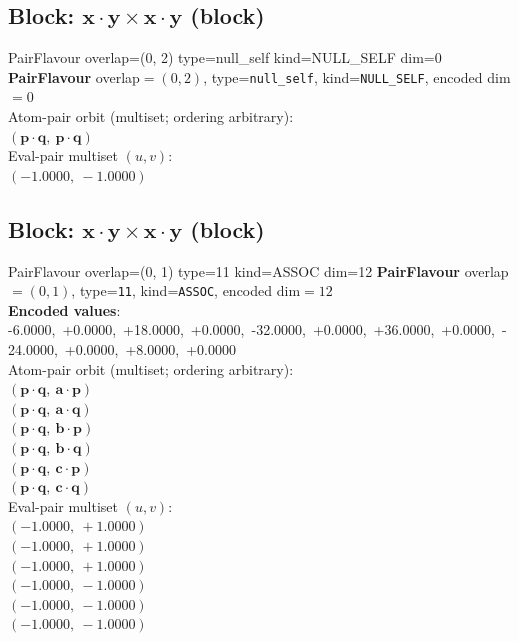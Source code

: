 \documentclass[a4paper,11pt]{article}
\newcommand{\pdcegfomjfhook}[2]{\mathbf{#1} \cdot \mathbf{#2}}
\begin{document}
\subsection{Block: $\pdcegfomjfhook{x}{y} \times \pdcegfomjfhook{x}{y}$  (block)}
    PairFlavour  overlap=(0, 2)  type=null\_self  kind=NULL\_SELF  dim=0
\textbf{PairFlavour} overlap$=(0, 2)$, type=\texttt{null\_self}, kind=\texttt{NULL\_SELF}, encoded dim$=0$\\
\quad Atom-pair orbit (multiset; ordering arbitrary):\\
$(\pdcegfomjfhook{p}{q},\ \pdcegfomjfhook{p}{q})$\\
\quad Eval-pair multiset $(u, v)$:\\
$(-1.0000,\ -1.0000)$\\

\subsection{Block: $\pdcegfomjfhook{x}{y} \times \pdcegfomjfhook{x}{y}$  (block)}
    PairFlavour  overlap=(0, 1)  type=11  kind=ASSOC  dim=12
\textbf{PairFlavour} overlap$=(0, 1)$, type=\texttt{11}, kind=\texttt{ASSOC}, encoded dim$=12$\\
\textbf{      Encoded values}: -6.0000,\ +0.0000,\ +18.0000,\ +0.0000,\ -32.0000,\ +0.0000,\ +36.0000,\ +0.0000,\ -24.0000,\ +0.0000,\ +8.0000,\ +0.0000\\
\quad Atom-pair orbit (multiset; ordering arbitrary):\\
$(\pdcegfomjfhook{p}{q},\ \pdcegfomjfhook{a}{p})$\\
$(\pdcegfomjfhook{p}{q},\ \pdcegfomjfhook{a}{q})$\\
$(\pdcegfomjfhook{p}{q},\ \pdcegfomjfhook{b}{p})$\\
$(\pdcegfomjfhook{p}{q},\ \pdcegfomjfhook{b}{q})$\\
$(\pdcegfomjfhook{p}{q},\ \pdcegfomjfhook{c}{p})$\\
$(\pdcegfomjfhook{p}{q},\ \pdcegfomjfhook{c}{q})$\\
\quad Eval-pair multiset $(u, v)$:\\
$(-1.0000,\ +1.0000)$\\
$(-1.0000,\ +1.0000)$\\
$(-1.0000,\ +1.0000)$\\
$(-1.0000,\ -1.0000)$\\
$(-1.0000,\ -1.0000)$\\
$(-1.0000,\ -1.0000)$\\
\end{document}
